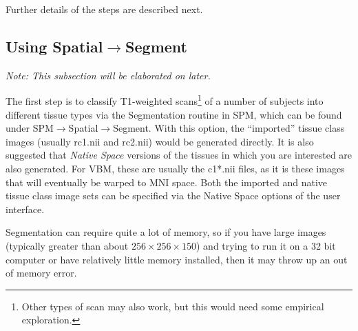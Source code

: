 Further details of the steps are described next.


\subsection{Using Spatial$\rightarrow$Segment}
\emph{Note: This subsection will be elaborated on later.}

The first step is to classify T1-weighted scans\footnote{Other types of scan may also work, but this would need some empirical exploration.} of a number of subjects into different tissue types via the Segmentation routine in SPM, which can be found under SPM$\rightarrow$Spatial$\rightarrow$Segment.
With this option, the ``imported'' tissue class images (usually rc1.nii and rc2.nii) would be generated directly.
It is also suggested that \emph{Native Space} versions of the tissues in which you are interested are also generated.
For VBM, these  are usually the c1*.nii files, as it is these images that will eventually be warped to MNI space.
Both the imported and native tissue class image sets can be specified via the Native Space options of the user interface.

Segmentation can require quite a lot of memory, so if you have large images (typically greater than about $256\times256\times150$) and trying to run it on a 32 bit computer or have relatively little memory installed, then it may throw up an out of memory error.
 
